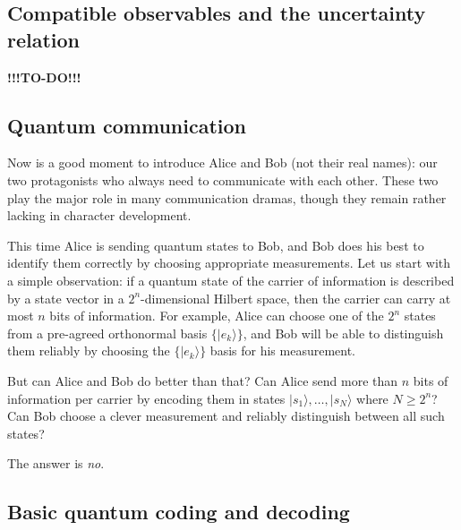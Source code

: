\documentclass[fleqn]{article}
\begin{document}
\hypertarget{compatible-observables-and-the-uncertainty-relation}{%
\subsection{Compatible observables and the uncertainty relation}\label{compatible-observables-and-the-uncertainty-relation}}

\textbf{!!!TO-DO!!!}

\hypertarget{quantum-communication}{%
\subsection{Quantum communication}\label{quantum-communication}}

Now is a good moment to introduce Alice and Bob (not their real names): our two protagonists who always need to communicate with each other.
These two play the major role in many communication dramas, though they remain rather lacking in character development.

This time Alice is sending quantum states to Bob, and Bob does his best to identify them correctly by choosing appropriate measurements.
Let us start with a simple observation: if a quantum state of the carrier of information is described by a state vector in a \(2^n\)-dimensional Hilbert space, then the carrier can carry at most \(n\) bits of information.
For example, Alice can choose one of the \(2^n\) states from a pre-agreed orthonormal basis \(\{|e_k\rangle\}\), and Bob will be able to distinguish them reliably by choosing the \(\{|e_k\rangle\}\) basis for his measurement.

But can Alice and Bob do better than that?
Can Alice send more than \(n\) bits of information per carrier by encoding them in states \(|s_1\rangle,\ldots,|s_N\rangle\) where \(N \geqslant 2^n\)?
Can Bob choose a clever measurement and reliably distinguish between all such states?

The answer is \emph{no}.

\hypertarget{basic-quantum-coding-and-decoding}{%
\subsection{Basic quantum coding and decoding}\label{basic-quantum-coding-and-decoding}}
\end{document}
